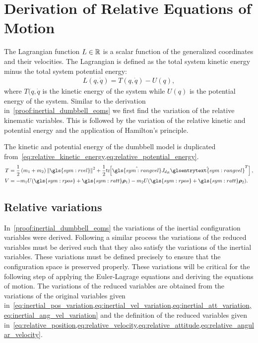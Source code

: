 
\chapter{Derivation of Relative Equations of Motion}\label{proof:relative_dumbbell_eoms}
The Lagrangian function \( L \in \mathbb{R} \) is a scalar function of the generalized coordinates and their velocities.
The Lagrangian is defined as the total system kinetic energy minus the total system potential energy:
\begin{align*}
    L(q, \dot{q} ) = T(q, \dot{q}) - U (q) ,
\end{align*}
where \( T(q, \dot{q} \) is the kinetic energy of the system while \( U(q) \) is the potential energy of the system.
Similar to the derivation in~\cref{proof:inertial_dumbbell_eoms} we first find  the variation of the relative kinematic variables.
This is followed by the variation of the relative kinetic and potential energy and the application of Hamilton's principle.

The kinetic and potential energy of the dumbbell model is duplicated from~\cref{eq:relative_kinetic_energy,eq:relative_potential_energy}.
\begin{align*}
    T &= \frac{1}{2} \parenth{m_1 + m_2} \norm{\gls{sym:rvel}}^2 + \frac{1}{2} \tr{\hat{\gls{sym:rangvel}} J_{d_R} \hat{\glsentrytext{sym:rangvel}}^T},\\
    V &= -m_1 U( \gls{sym:rpos} + \gls{sym:ratt} \vc{\rho}_1) - m_2 U(\gls{sym:rpos} + \gls{sym:ratt} \vc{\rho}_2).
\end{align*}

\section{Relative variations}\label{ssec:relative_variations}
In~\cref{proof:inertial_dumbbell_eoms} the variations of the inertial configuration variables were derived.
Following a similar process the variations of the reduced variables must be derived such that they also satisfy the variations of the inertial variables.
These variations must be defined precisely to ensure that the configuration space is preserved properly. 
These variations will be critical for the following step of applying the Euler-Lagrage equations and deriving the equations of motion.
The variations of the reduced variables are obtained from the variations of the original variables given in~\cref{eq:inertial_pos_variation,eq:inertial_vel_variation,eq:inertial_att_variation,eq:inertial_ang_vel_variation} and the definition of the reduced variables given in~\cref{eq:relative_position,eq:relative_velocity,eq:relative_attitude,eq:relative_angular_velocity}.

